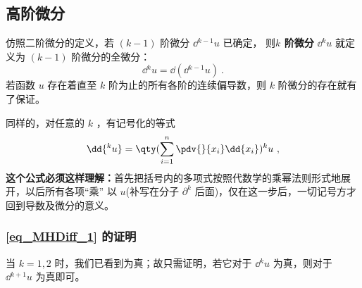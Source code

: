 \subsection{高阶微分}
仿照二阶微分的定义，若 $(k-1)$ 阶微分 $\dd{^{k-1}}u$ 已确定， 则\textbf{$k$ 阶微分} $\dd{^ku}$ 就定义为 $(k-1)$ 阶微分的全微分：
\begin{equation}
\dd{^k u}=\dd{(\dd{^{k-1}}u)}~.
\end{equation}
若函数 $u$ 存在着直至 $k$ 阶为止的所有各阶的连续偏导数，则 $k$ 阶微分的存在就有了保证。

 同样的，对任意的 $k$ ，有记号化的等式
 \begin{equation}\label{eq_MHDiff_1}
 \dd{^ku}=\qty(\sum_{i=1}^n\pdv{}{x_i}\dd{x_i})^k u~,
 \end{equation}
 \textbf{这个公式必须这样理解：}首先把括号内的多项式按照代数学的乘幂法则形式地展开，以后所有各项“乘” 以 $u$(补写在分子 $\partial^k$ 后面)，仅在这一步后，一切记号方才回到导数及微分的意义。
 \subsubsection{\autoref{eq_MHDiff_1} 的证明}
 当 $k=1,2$ 时，我们已看到为真；故只需证明，若它对于 $\dd{^k u}$ 为真，则对于 $\dd{^{k+1}u}$ 为真即可。
 
